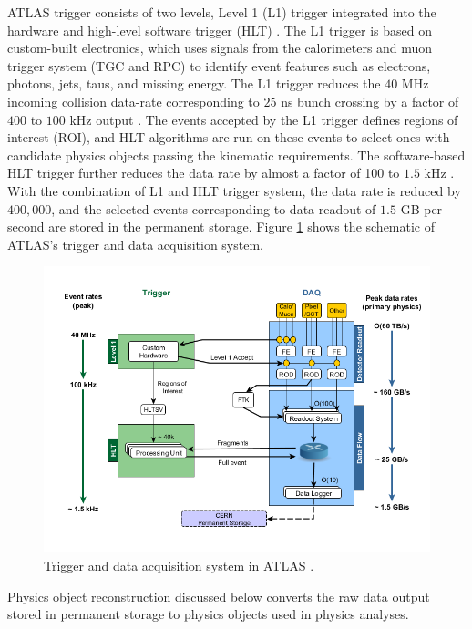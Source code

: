 ATLAS trigger consists of two levels, Level 1 (L1) trigger integrated into the hardware and high-level software trigger (HLT) \cite{TriggerSystemATLAS}. The L1 trigger is based on custom-built electronics, which uses signals from the calorimeters and muon trigger system (TGC and RPC) to identify event features such as electrons, photons, jets, taus, and missing energy. The L1 trigger reduces the $40$ MHz incoming collision data-rate corresponding to $25$ ns bunch crossing by a factor of $400$ to $100$ kHz output \cite{TriggerSystemATLAS}. The events accepted by the L1 trigger defines regions of interest (ROI), and HLT algorithms are run on these events to select ones with candidate physics objects passing the kinematic requirements. The software-based HLT trigger further reduces the data rate by almost a factor of 100 to $1.5$ kHz \cite{ATLAS}. With the combination of L1 and HLT trigger system, the data rate is reduced by $400,000$, and the selected events corresponding to data readout of $1.5$ GB per second are stored in the permanent storage. Figure \ref{fig:DAQ} shows the schematic of ATLAS's trigger and data acquisition system. 

\begin{figure}
    \centering
    \includegraphics[width=.8\linewidth]{figures/LHC/DAQ_ATLAS.png}
    \caption{ Trigger and data acquisition system in ATLAS \cite{ATLAS_DAQ}.\label{fig:DAQ}}
\end{figure}

Physics object reconstruction discussed below converts the raw data output stored in permanent storage to physics objects used in physics analyses. 

